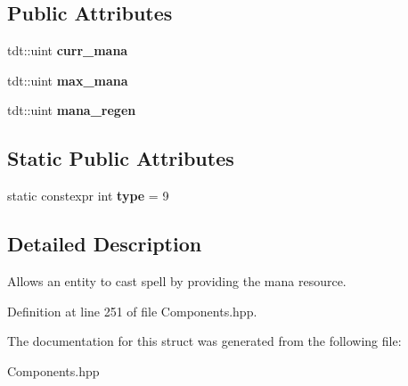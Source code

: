 \subsection*{Public Attributes}
\begin{DoxyCompactItemize}
\item 
tdt\+::uint {\bfseries curr\+\_\+mana}\hypertarget{struct_mana_component_a1d99d23dc40a6ee149a2ad0c56edb71b}{}\label{struct_mana_component_a1d99d23dc40a6ee149a2ad0c56edb71b}

\item 
tdt\+::uint {\bfseries max\+\_\+mana}\hypertarget{struct_mana_component_a6cd862915a91199598caee00cab5329f}{}\label{struct_mana_component_a6cd862915a91199598caee00cab5329f}

\item 
tdt\+::uint {\bfseries mana\+\_\+regen}\hypertarget{struct_mana_component_ad94e808603049d8874a5424d6614d866}{}\label{struct_mana_component_ad94e808603049d8874a5424d6614d866}

\end{DoxyCompactItemize}
\subsection*{Static Public Attributes}
\begin{DoxyCompactItemize}
\item 
static constexpr int {\bfseries type} = 9\hypertarget{struct_mana_component_a885556532924982aa81671faf62c62fb}{}\label{struct_mana_component_a885556532924982aa81671faf62c62fb}

\end{DoxyCompactItemize}


\subsection{Detailed Description}
Allows an entity to cast spell by providing the mana resource. 

Definition at line 251 of file Components.\+hpp.



The documentation for this struct was generated from the following file\+:\begin{DoxyCompactItemize}
\item 
Components.\+hpp\end{DoxyCompactItemize}
